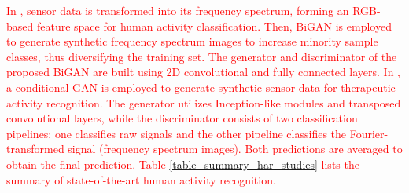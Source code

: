 \documentclass[preprint,12pt]{elsarticle}
\begin{document}
\textcolor{red}{In \citep{kia_human_2024}, sensor data is transformed into its frequency spectrum, forming an RGB-based feature space for human activity classification. Then, BiGAN is employed to generate synthetic frequency spectrum images to increase minority sample classes, thus diversifying the training set. The generator and discriminator of the proposed BiGAN are built using 2D convolutional and fully connected layers. In \citep{mohammadzadeh_cgan-based_2025}, a conditional GAN is employed to generate synthetic sensor data for therapeutic activity recognition. The generator utilizes Inception-like modules and transposed convolutional layers, while the discriminator consists of two classification pipelines: one classifies raw signals and the other pipeline classifies the Fourier-transformed signal (frequency spectrum images). Both predictions are averaged to obtain the final prediction. Table \ref{table_summary_har_studies} lists the summary of state-of-the-art human activity recognition.}
\end{document}
